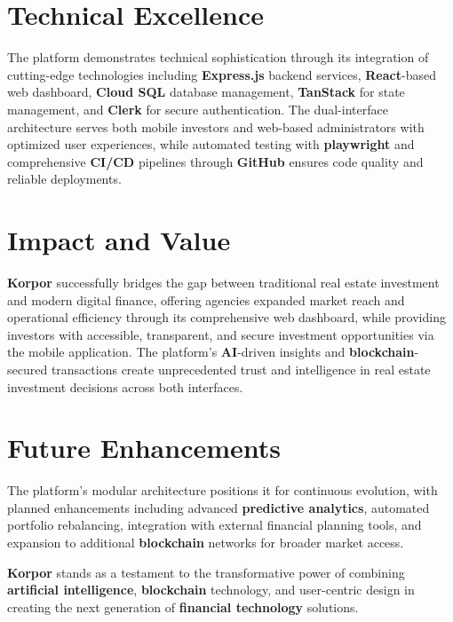 \section{Technical Excellence}

The platform demonstrates technical sophistication through its integration of cutting-edge technologies including \textbf{Express.js} backend services, \textbf{React}-based web dashboard, \textbf{Cloud SQL} database management, \textbf{TanStack} for state management, and \textbf{Clerk} for secure authentication. The dual-interface architecture serves both mobile investors and web-based administrators with optimized user experiences, while automated testing with \textbf{playwright} and comprehensive \textbf{CI/CD} pipelines through \textbf{GitHub} ensures code quality and reliable deployments.

\section{Impact and Value}

\textbf{\textcolor{primary}{Korpor}} successfully bridges the gap between traditional real estate investment and modern digital finance, offering agencies expanded market reach and operational efficiency through its comprehensive web dashboard, while providing investors with accessible, transparent, and secure investment opportunities via the mobile application. The platform's \textbf{AI}-driven insights and \textbf{blockchain}-secured transactions create unprecedented trust and intelligence in real estate investment decisions across both interfaces.

\section{Future Enhancements}

The platform's modular architecture positions it for continuous evolution, with planned enhancements including advanced \textbf{predictive analytics}, automated portfolio rebalancing, integration with external financial planning tools, and expansion to additional \textbf{blockchain} networks for broader market access.

\textbf{\textcolor{primary}{Korpor}} stands as a testament to the transformative power of combining \textbf{artificial intelligence}, \textbf{blockchain} technology, and user-centric design in creating the next generation of \textbf{financial technology} solutions.

\clearpage
{} %